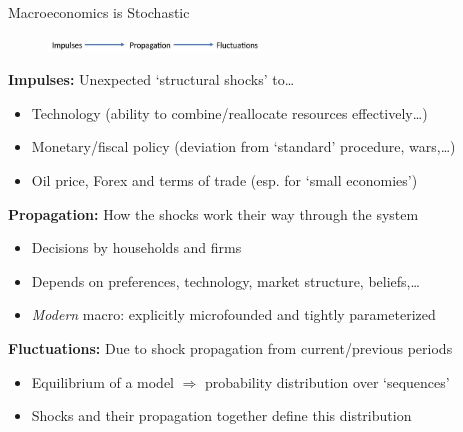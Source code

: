 \begin{frame}{Macroeconomics is Stochastic}

\begin{figure}
\centering
\label{fig:impulse_prop_fluct}
\includegraphics[width=0.5\textwidth]{Figures/impulse_prop_fluct.JPG}
\end{figure}

\textbf{Impulses:} Unexpected `structural shocks' to\ldots
	\begin{itemize}
	\item	Technology (ability to combine/reallocate resources effectively\ldots)
	\item	Monetary/fiscal policy (deviation from `standard' procedure, wars,\ldots)
	\item	Oil price, Forex and terms of trade (esp. for `small economies')
	\end{itemize}
\vspace{1.5mm}
\textbf{Propagation:} How the shocks work their way through the system
	\begin{itemize}
	\item	Decisions by households and firms
	\item	Depends on preferences, technology, market structure, beliefs,\ldots
	\item	\textit{Modern} macro: explicitly microfounded and tightly parameterized
	\end{itemize}
\vspace{1.5mm}
\textbf{Fluctuations:} Due to shock propagation from current/previous periods
	\begin{itemize}
	\item	Equilibrium of a model $\Rightarrow$ probability distribution over `sequences'
	\item	Shocks and their propagation together define this distribution
	\end{itemize}

\end{frame}


